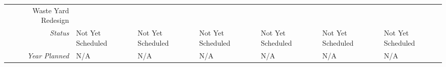 \begin{tabularx}{\textwidth}{r|X|X|X|X|X|X|}
\multicolumn{1}{|V{.2\columnwidth}|}{\cellcolor{ccorangelight}Waste Yard Redesign}          &                                                                  &                                                                  &                                                                  &                                                                  &                                                                  &                                                                  \\
    \multicolumn{1}{|r|}{\cellcolor{ccorangelight}\textit{Status}}                & Not Yet Scheduled                                                         & Not Yet Scheduled                                                         & Not Yet Scheduled                                                         & Not Yet Scheduled                                                         & Not Yet Scheduled                                                         & Not Yet Scheduled                                                         \\
    \multicolumn{1}{|r|}{\cellcolor{ccorangelight}\textit{Year Planned}}                  & N/A                                                     & N/A                                                     & N/A                                                     & N/A                                                     & N/A                                                     & N/A                                                     \\ \hline
\end{tabularx}